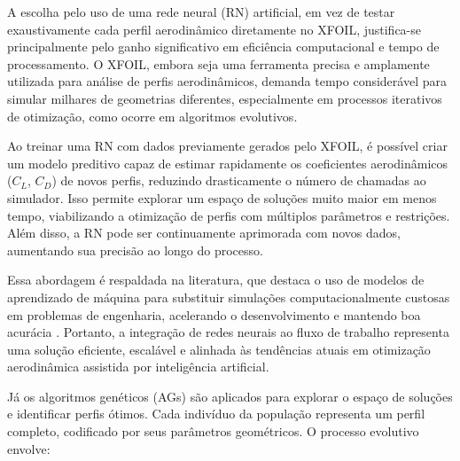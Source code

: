 A escolha pelo uso de uma rede neural (RN) artificial, em vez de testar exaustivamente cada perfil aerodinâmico diretamente no XFOIL, justifica-se principalmente pelo ganho significativo em eficiência computacional e tempo de processamento. O XFOIL, embora seja uma ferramenta precisa e amplamente utilizada para análise de perfis aerodinâmicos, demanda tempo considerável para simular milhares de geometrias diferentes, especialmente em processos iterativos de otimização, como ocorre em algoritmos evolutivos.

Ao treinar uma RN com dados previamente gerados pelo XFOIL, é possível criar um modelo preditivo capaz de estimar rapidamente os coeficientes aerodinâmicos (\(C_L\), \(C_D\)) de novos perfis, reduzindo drasticamente o número de chamadas ao simulador. Isso permite explorar um espaço de soluções muito maior em menos tempo, viabilizando a otimização de perfis com múltiplos parâmetros e restrições. Além disso, a RN pode ser continuamente aprimorada com novos dados, aumentando sua precisão ao longo do processo.

Essa abordagem é respaldada na literatura, que destaca o uso de modelos de aprendizado de máquina para substituir simulações computacionalmente custosas em problemas de engenharia, acelerando o desenvolvimento e mantendo boa acurácia \cite{goodfellow2016deep, wu2024}. Portanto, a integração de redes neurais ao fluxo de trabalho representa uma solução eficiente, escalável e alinhada às tendências atuais em otimização aerodinâmica assistida por inteligência artificial.

Já os algoritmos genéticos (AGs) são aplicados para explorar o espaço de soluções e identificar perfis ótimos. Cada indivíduo da população representa um perfil completo, codificado por seus parâmetros geométricos. O processo evolutivo envolve:


